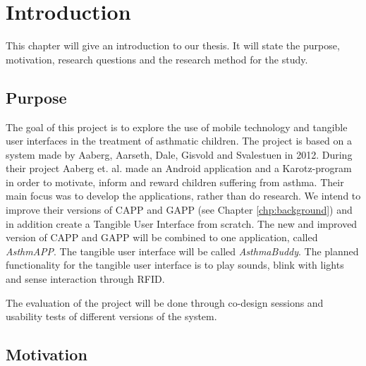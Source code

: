 \chapter{Introduction}
\label{chp:introduction}

This chapter will give an introduction to our thesis. It will state the purpose, motivation, research questions and the research method for the study. 

\section{Purpose}
\label{sec:purpose}

The goal of this project is to explore the use of mobile technology and tangible user interfaces in the treatment of asthmatic children. The project is based on a system made by Aaberg, Aarseth, Dale, Gisvold and Svalestuen in 2012\cite{CustomerDriven}. During their project Aaberg et. al. made an Android application and a Karotz-program in order to motivate, inform and reward children suffering from asthma. Their main focus was to develop the applications, rather than do research.
We intend to improve their versions of CAPP and GAPP (see Chapter \ref{chp:background}) and in addition create a Tangible User Interface from scratch. The new and improved version of CAPP and GAPP will be combined to one application, called \emph{AsthmAPP}. The tangible user interface will be called \emph{AsthmaBuddy}. The planned functionality for the tangible user interface is to play sounds, blink with lights and sense interaction through RFID. 

The evaluation of the project will be done through co-design sessions and usability tests of different versions of the system. 
 

\section{Motivation}
\label{sec:motivation}
